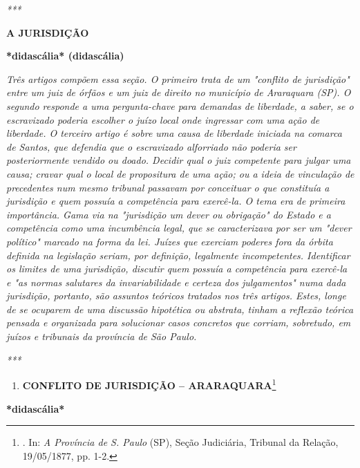 \emph{***}

\protect\hypertarget{Secao_Sem_Titulo-2}{}{}\textbf{A JURISDIÇÃO}

\textbf{*didascália* (didascália)}

\emph{Três artigos compõem essa seção. O primeiro trata de um "conflito
de jurisdição" entre um juiz de órfãos e um juiz de direito no município
de Araraquara (SP). O segundo responde a uma pergunta-chave para
demandas de liberdade, a saber, se o escravizado poderia escolher o
juízo local onde ingressar com uma ação de liberdade. O terceiro artigo
é sobre uma causa de liberdade iniciada na comarca de Santos, que
defendia que o escravizado alforriado não poderia ser posteriormente
vendido ou doado. Decidir qual o juiz competente para julgar uma causa;
cravar qual o local de propositura de uma ação; ou a ideia de vinculação
de precedentes num mesmo tribunal passavam por conceituar o que
constituía a jurisdição e quem possuía a competência para exercê-la. O
tema era de primeira importância. Gama via na "jurisdição um dever ou
obrigação" do Estado e a competência como uma incumbência legal, que se
caracterizava por ser um "dever político" marcado na forma da lei.
Juízes que exerciam poderes fora da órbita definida na legislação
seriam, por definição, legalmente incompetentes. Identificar os limites
de uma jurisdição, discutir quem possuía a competência para exercê-la e
"as normas salutares da invariabilidade e certeza dos julgamentos" numa
dada jurisdição, portanto, são assuntos teóricos tratados nos três
artigos. Estes, longe de se ocuparem de uma discussão hipotética ou
abstrata, tinham a reflexão teórica pensada e organizada para solucionar
casos concretos que corriam, sobretudo, em juízos e tribunais da
província de São Paulo. }

\emph{***}

\begin{enumerate}
\def\labelenumi{\arabic{enumi}.}
\item
  \textbf{CONFLITO DE JURISDIÇÃO -- ARARAQUARA}\footnote{. In: \emph{A
    Província de S. Paulo} (SP), Seção Judiciária, Tribunal da Relação,
    19/05/1877, pp. 1-2.}
\end{enumerate}

\textbf{*didascália*}

